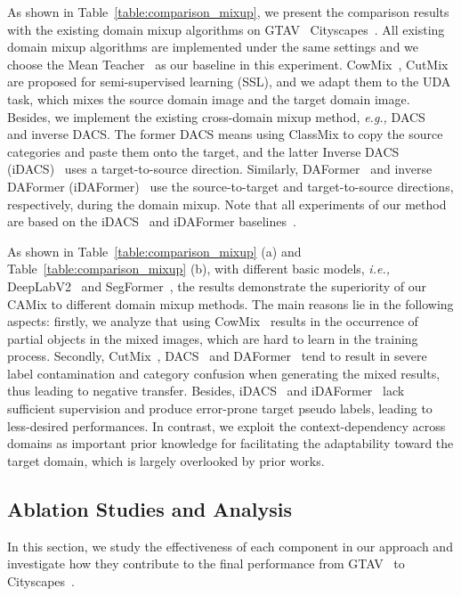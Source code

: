\documentclass[journal]{IEEEtran}
\begin{document}
{\begin{minipage}{\textwidth}
As shown in Table~\ref{table:comparison_mixup}, we present the comparison results with the existing domain mixup algorithms on GTAV~\cite{stephan2016gtav}  Cityscapes~\cite{cordts2016cityscapes}.  All existing domain mixup algorithms are implemented under the same settings and we choose the Mean Teacher~\cite{Mean_teacher} as our baseline in this experiment.
CowMix~\cite{french2020milking}, CutMix~\cite{french2019semi} are proposed for semi-supervised learning (SSL), and we adapt them to the UDA task, which mixes the source domain image and the target domain image. Besides, we implement the existing cross-domain mixup method, \emph{e.g.,} DACS~\cite{tranheden2020dacs} and inverse DACS.
The former DACS means using ClassMix to copy the source categories and paste them onto the target, and the latter Inverse DACS (iDACS)~\cite{tranheden2020dacs} uses a target-to-source direction. Similarly, DAFormer~\cite{hoyer2022daformer} and inverse DAFormer (iDAFormer)~\cite{hoyer2022daformer} use the source-to-target and target-to-source directions, respectively, during the domain mixup. Note that all experiments of our method are based on the iDACS~\cite{tranheden2020dacs} and iDAFormer baselines~\cite{hoyer2022daformer}.


As shown in Table~\ref{table:comparison_mixup} (a) and Table~\ref{table:comparison_mixup} (b), with different basic models, \emph{i.e.,} DeepLabV2~\cite{chen2018deeplab} and SegFormer~\cite{xie2021segformer}, the results demonstrate the superiority of our CAMix to different domain mixup methods.
The main reasons lie in the following aspects:
firstly, we analyze that using CowMix~\cite{french2020milking} results in the occurrence of partial objects in the mixed images, which are hard to learn in the training process. Secondly, CutMix~\cite{french2019semi}, DACS~\cite{tranheden2020dacs} and DAFormer~\cite{hoyer2022daformer} tend to result in severe label contamination and category confusion when generating the mixed results, thus leading to negative transfer.
Besides, iDACS~\cite{tranheden2020dacs} and iDAFormer~\cite{hoyer2022daformer} lack sufficient supervision and produce error-prone target pseudo labels, leading to less-desired performances. In contrast, we exploit the context-dependency across domains as important prior knowledge for facilitating the adaptability toward the target domain, which is largely overlooked by prior works.



\subsection{Ablation Studies and Analysis}
\label{sec:ablation}
In this section, we study the effectiveness of each component in our approach and investigate how they contribute to the final performance from GTAV~\cite{stephan2016gtav} to Cityscapes~\cite{cordts2016cityscapes}.


\end{minipage}}
\end{document}
